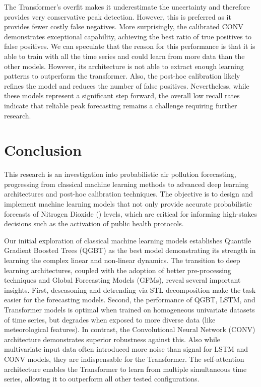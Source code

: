 \documentclass[12pt,a4paper]{book}
\begin{document}
The Transformer's overfit makes it underestimate the uncertainty and therefore provides very conservative peak detection. However, this is preferred as it provides fewer costly false negatives. More surprisingly, the calibrated CONV demonstrates exceptional capability, achieving the best ratio of true positives to false positives. We can speculate that the reason for this performance is that it is able to train with all the time series and could learn from more data than the other models. However, its architecture is not able to extract enough learning patterns to outperform the transformer. Also, the post-hoc calibration likely refines the model and reduces the number of false positives. Nevertheless, while these models represent a significant step forward, the overall low recall rates indicate that reliable peak forecasting remains a challenge requiring further research.


\chapter{Conclusion}
This research is an investigation into probabilistic air pollution forecasting, progressing from classical machine learning methods to advanced deep learning architectures and post-hoc calibration techniques. The objective is to design and implement machine learning models that not only provide accurate probabilistic forecasts of Nitrogen Dioxide (\no{}) levels, which are critical for informing high-stakes decisions such as the activation of public health protocols. 

Our initial exploration of classical machine learning models establishes Quantile Gradient Boosted Trees (QGBT) as the best model demonstrating its strength in learning the complex linear and non-linear dynamics. The transition to deep learning architectures, coupled with the adoption of better pre-processing techniques and Global Forecasting Models (GFMs), reveal several important insights. First, deseasoning and detrending via STL decomposition make the task easier for the forecasting models. Second, the performance of QGBT, LSTM, and Transformer models is optimal when trained on homogeneous univariate datasets of \no{} time series, but degrades when exposed to more diverse data (like meteorological features). In contrast, the Convolutional Neural Network (CONV) architecture demonstrates superior robustness against this. Also while multivariate input data often introduced more noise than signal for LSTM and CONV models, they are indispensable for the Transformer. The self-attention architecture enables the Transformer to learn from multiple simultaneous time series, allowing it to outperform all other tested configurations. 
\end{document}
